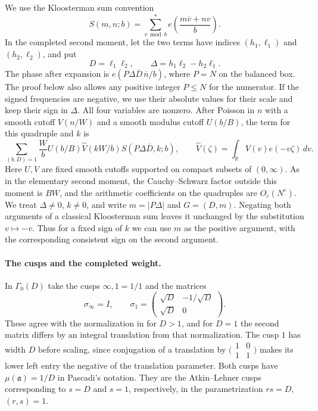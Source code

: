\documentclass[11pt]{amsart}
\numberwithin{equation}{section}
\theoremstyle{remark}
\begin{document}
We use the Kloosterman sum convention
\[
 S(m,n;b)=\sum_{v\bmod b}^{*}e\!\left(\frac{m\overline v+nv}{b}\right).
\]
In the completed second moment, let the two terms have indices
\((h_1,\ell_1)\) and \((h_2,\ell_2)\), and put
\[
 D=\ell_1\ell_2,\qquad
 \Delta=h_1\ell_2-h_2\ell_1.
\]
The phase after expansion is \(e(P\Delta\overline D\,\overline n/b)\),
where \(P=N\) on the balanced box. The proof below also allows any
positive integer \(P\le N\) for the numerator. If the signed frequencies
are negative, we use their absolute values for their scale and keep
their sign in \(\Delta\). All four variables are nonzero. After Poisson
in \(n\) with a smooth cutoff \(V(n/W)\) and a smooth modulus cutoff
\(U(b/B)\), the term for this quadruple and \(k\) is
\[
 \sum_{(b,D)=1}\frac{W}{b}U(b/B)\widehat V(kW/b)
           S(P\Delta\overline D,k;b),
 \qquad
 \widehat V(\zeta)=\int_{\mathbb R}V(v)e(-v\zeta)\,dv.
\]
Here \(U,V\) are fixed smooth cutoffs supported on compact subsets
of \((0,\infty)\). As in the elementary second moment, the Cauchy--Schwarz
factor outside this moment is \(BW\), and the arithmetic coefficients
on the quadruples are \(O_\varepsilon(N^\varepsilon)\).
We treat \(\Delta\ne0\), \(k\ne0\), and write \(m=|P\Delta|\) and
\(G=(D,m)\). Negating both arguments of a classical Kloosterman sum
leaves it unchanged by the substitution \(v\mapsto -v\).
Thus for a fixed sign of \(k\) we can use \(m\) as the positive argument,
with the corresponding consistent sign on the second argument.

\paragraph{The cusps and the completed weight.}
In \(\Gamma_0(D)\) take the cusps \(\infty,1=1/1\) and the matrices
\[
 \sigma_\infty=I,\qquad
 \sigma_1=\begin{pmatrix}\sqrt D&-1/\sqrt D\\
                           \sqrt D&0\end{pmatrix}.
\]
These agree with the normalization in \cite[(3.9)]{PascadiPi}
for \(D>1\), and for \(D=1\) the second matrix differs by an integral
translation from that normalization. The cusp \(1\) has width \(D\)
before scaling, since conjugation of a translation by
\(\bigl(\begin{smallmatrix}1&0\\1&1\end{smallmatrix}\bigr)\)
makes its lower left entry the negative of the translation parameter.
Both cusps have \(\mu(\mathfrak a)=1/D\) in Pascadi's notation. They
are the Atkin--Lehner cusps corresponding to \(s=D\) and \(s=1\),
respectively, in the parametrization \(rs=D\), \((r,s)=1\).
\end{document}
